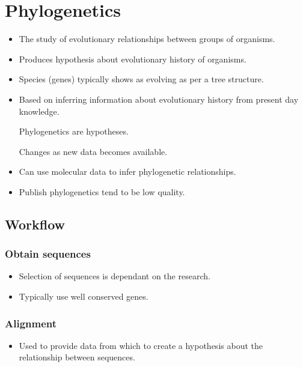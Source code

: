 \documentclass[a4paper]{article}
\begin{document}
\section{Phylogenetics}

\begin{itemize}
  \item
    The study of evolutionary relationships between groups of organisms.

  \item
    Produces hypothesis about evolutionary history of organisms.

  \item
    Species (genes) typically shows as evolving as per a tree structure.

  \item
    Based on inferring information about evolutionary history from present day
    knowledge.

    Phylogenetics are hypotheses.

    Changes as new data becomes available.

  \item
    Can use molecular data to infer phylogenetic relationships.

  \item
    Publish phylogenetics tend to be low quality.
\end{itemize}

\subsection{Workflow}

\subsubsection{Obtain sequences}

\begin{itemize}
  \item
    Selection of sequences is dependant on the research.

  \item
    Typically use well conserved genes.
\end{itemize}

\subsubsection{Alignment}

\begin{itemize}
  \item
    Used to provide data from which to create a hypothesis about the
    relationship between sequences.
\end{itemize}
\end{document}

